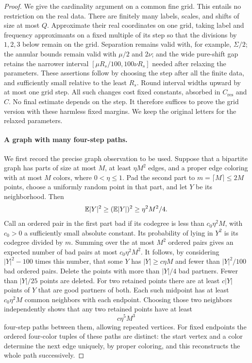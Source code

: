 \begin{proof}
We give the cardinality argument on a common fine grid.  This entails
no restriction on the real data.  There are finitely many labels,
scales, and shifts of size at most $Q$.  Approximate their real
coordinates on one grid, taking label and frequency approximants on
a fixed multiple of its step so that the divisions by $1,2,3$ below
remain on the grid.  Separation remains valid with, for example,
$\Sigma/2$; the annular bounds remain valid with $\mu/2$ and $2\nu$;
and the wide pure-shift gap retains the narrower interval
$[\mu R_s/100,100\nu R_s]$ needed after relaxing the parameters.
These assertions follow by choosing the step after all the
finite data, and sufficiently small relative to the least $R_s$.
Round interval widths upward by at most one grid step.  All such
changes cost fixed constants, absorbed in $C_{\mathrm{res}}$ and $C$.
No final estimate depends on the step.  It therefore suffices to
prove the grid version with these harmless fixed margins.  We keep
the original letters for the relaxed parameters.

\paragraph{A graph with many four-step paths.}
We first record the precise graph observation to be used.  Suppose
that a bipartite graph has parts of size at most $M$, at least
$\eta M^2$ edges, and a proper edge coloring with at most $M$ colors,
where $0<\eta\leq1$.  Pad the second part to
$m=\lceil M\rceil\leq2M$ points, choose a uniformly random point in
that part, and let $Y$ be its neighborhood.  Then
\[
 \mathbb E|Y|^2\geq(\mathbb E|Y|)^2\geq\eta^2M^2/4.
\]
Call an ordered pair in the first part bad if its codegree is less
than $c_0\eta^2M$, with $c_0>0$ a sufficiently small absolute
constant.  Its probability of lying in $Y^2$ is its codegree divided
by $m$.  Summing over the at most $M^2$ ordered pairs gives an expected
number of bad pairs at most $c_0\eta^2M^2$.  It follows, by considering
$|Y|^2-100$ times this number, that some $Y$ has
$|Y|\geq c\eta M$ and fewer than $|Y|^2/100$ bad ordered pairs.
Delete the points with more than $|Y|/4$ bad partners.  Fewer than
$|Y|/25$ points are deleted.  For two retained points there are at
least $c|Y|$ points of $Y$ that are good partners of both.  Each
such midpoint has at least $c_0\eta^2M$ common neighbors with each
endpoint.  Choosing those two neighbors independently shows that
any two retained points have at least
\[
 c\eta^5 M^3
\]
four-step paths between them, allowing repeated vertices.  For fixed
endpoints the ordered four-color tuples of these paths are distinct:
the start vertex and a color determine the next edge uniquely, by
proper coloring, and this reconstructs the whole path successively.


\end{proof}
